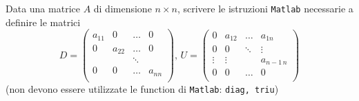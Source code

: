 \noindent
Data una matrice $A$ di dimensione $n\times n$, scrivere le istruzioni {\tt Matlab} necessarie a definire le matrici
\[ D=
\left( \begin{array}{cccc}
  a_{11} & 0 &\dots & 0 \\
  0 & a_{22} & \dots & 0 \\
& & \ddots& \\
  0 & 0&\dots & a_{nn} \\
\end{array} \right), \,
 U = \left( \begin{array}{cccc}
  0 & a_{12} &\dots &  a_{1n} \\
  0 &  0 &\ddots &   \vdots \\
  \vdots&    \vdots &   & a_{n-1\, n} \\
  0 & 0&\dots   &0\\
\end{array} \right)
\]
(non devono essere utilizzate le function di {\tt Matlab}: {\tt diag, triu})